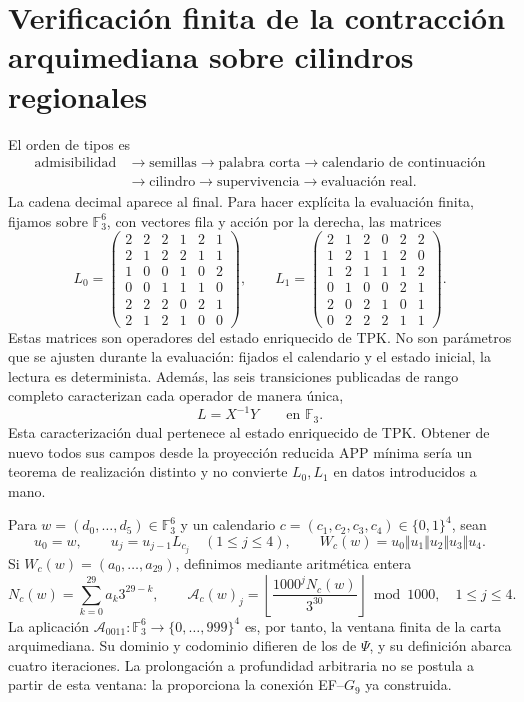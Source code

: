 \section{Verificación finita de la contracción arquimediana sobre cilindros regionales}

El orden de tipos es
\[
\begin{aligned}
\text{admisibilidad}
&\to\text{semillas}
\to\text{palabra corta}
\to\text{calendario de continuación}\\
&\to\text{cilindro}
\to\text{supervivencia}
\to\text{evaluación real}.
\end{aligned}
\]
La cadena decimal aparece al final. Para hacer explícita la evaluación
finita, fijamos sobre \(\mathbb F_3^6\), con vectores fila y acción por la
derecha, las matrices
\[
L_0=
\begin{pmatrix}
2&2&2&1&2&1\\
2&1&2&2&1&1\\
1&0&0&1&0&2\\
0&0&1&1&1&0\\
2&2&2&0&2&1\\
2&1&2&1&0&0
\end{pmatrix},
\qquad
L_1=
\begin{pmatrix}
2&1&2&0&2&2\\
1&2&1&1&2&0\\
1&2&1&1&1&2\\
0&1&0&0&2&1\\
2&0&2&1&0&1\\
0&2&2&2&1&1
\end{pmatrix}.
\]
Estas matrices son operadores del estado enriquecido de TPK. No son parámetros que
se ajusten durante la evaluación: fijados el calendario y el estado inicial,
la lectura es determinista. Además, las seis transiciones publicadas de rango
completo caracterizan cada operador de manera única,
\[
L=X^{-1}Y\qquad\text{en }\mathbb F_3.
\]
Esta caracterización dual pertenece al estado enriquecido de TPK. Obtener de nuevo todos
sus campos desde la proyección reducida APP mínima sería un teorema de
realización distinto y no convierte \(L_0,L_1\) en datos introducidos a mano.

Para \(w=(d_0,\ldots,d_5)\in\mathbb F_3^6\) y un calendario
\(c=(c_1,c_2,c_3,c_4)\in\{0,1\}^4\), sean
\[
 u_0=w,
 \qquad
 u_j=u_{j-1}L_{c_j}\quad(1\leq j\leq4),
 \qquad
 W_c(w)=u_0\Vert u_1\Vert u_2\Vert u_3\Vert u_4.
\]
Si \(W_c(w)=(a_0,\ldots,a_{29})\), definimos mediante aritmética entera
\[
 N_c(w)=\sum_{k=0}^{29}a_k3^{29-k},
 \qquad
 \mathcal A_c(w)_j=
 \left\lfloor\frac{1000^jN_c(w)}{3^{30}}\right\rfloor\bmod1000,
 \quad1\leq j\leq4.
\]
La aplicación
\(\mathcal A_{0011}:\mathbb F_3^6\to\{0,\ldots,999\}^4\) es, por tanto,
la ventana finita de la carta arquimediana. Su dominio y codominio difieren de
los de \(\Psi\), y su definición abarca cuatro iteraciones. La prolongación a
profundidad arbitraria no se postula a partir de esta ventana: la proporciona
la conexión EF--\(G_9\) ya construida.

